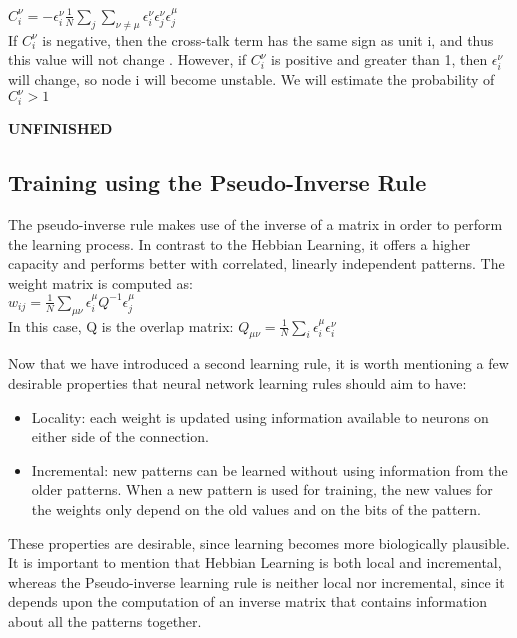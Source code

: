  \( C_{i}^{\nu}= -\epsilon_{i}^{\nu} \frac{1}{N}\sum_{j} \sum_{\nu\neq\mu} 			 			\epsilon_{i}^{\nu}
		       		 \epsilon_{j}^{\nu}
				 \epsilon_{j}^{\mu}\)\\
 
 If \( C_{i}^{\nu} \) is negative, then the cross-talk term has the same sign as unit i, and thus this value will not change \cite{lectureslides}. However, if \( C_{i}^{\nu} \) is positive and greater than 1, then \( \epsilon_{i}^{\nu}\) will change, so node i will become unstable. We will estimate the probability of \( C_{i}^{\nu} > 1 \)
 
 \textbf{UNFINISHED}
 
\subsection{Training using the Pseudo-Inverse Rule}

The pseudo-inverse rule makes use of the inverse of a matrix in order to perform the learning process. In contrast to the Hebbian Learning, it offers a higher capacity and performs better with correlated, linearly independent patterns. The weight matrix is computed as:\\

\( w_{ij} = \frac{1}{N} \sum_{\mu\nu}\epsilon_{i}^\mu Q^{-1} \epsilon_{j}^\mu \)\\

In this case, Q is the overlap matrix:
\(  Q_{\mu\nu} = \frac{1}{N}\sum_{i}\epsilon_{i}^\mu \epsilon_{i}^\nu \)

Now that we have introduced a second learning rule, it is worth mentioning a few desirable properties that neural network learning rules should aim to have:
\begin{itemize}
 \item Locality: each weight is updated using information available to neurons on either side of the connection. 
 \item Incremental: new patterns can be learned without using information from the older patterns. When a new pattern is used for training, the new values for the weights only depend on the old values and on the bits of the pattern.
\end{itemize}

These properties are desirable, since learning becomes more biologically plausible. It is important to mention that Hebbian Learning is both local and incremental, whereas the Pseudo-inverse learning rule is neither local nor incremental, since it depends upon the computation of an inverse matrix that contains information about all the patterns together.

